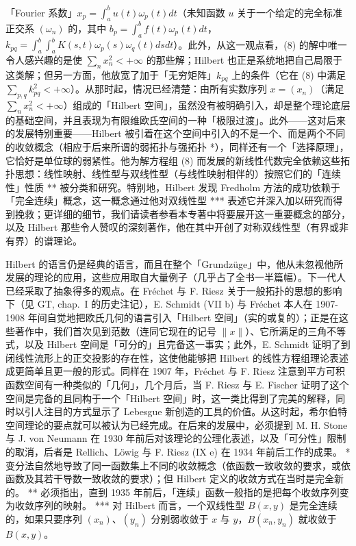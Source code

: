 「Fourier 系数」\(x_{p} = \int_{a}^{b} u(t) \omega_{p}(t) dt\)（未知函数 \(u\) 关于一个给定的完全标准正交系 \((\omega_{n})\) 的，其中 \(b_{p} = \int_{a}^{b} f(t) \omega_{p}(t) dt\)，\(k_{pq} = \int_{a}^{b} \int_{a}^{b} K(s, t) \omega_{p}(s) \omega_{q}(t) ds dt\)）。此外，从这一观点看，(8) 的解中唯一令人感兴趣的是使 \(\sum_{n} x_{n}^{2} < +\infty\) 的那些解；Hilbert 也正是系统地把自己局限于这类解；但另一方面，他放宽了加于「无穷矩阵」\(k_{pq}\) 上的条件（它在 (8) 中满足 \(\sum_{p,q} k_{pq}^{2} < +\infty\)）。从那时起，情况已经清楚：由所有实数序列 \(x = (x_{n})\)（满足 \(\sum_{n} x_{n}^{2} < +\infty\)）组成的「Hilbert 空间」，虽然没有被明确引入，却是整个理论底层的基础空间，并且表现为有限维欧氏空间的一种「极限过渡」。此外——这对后来的发展特别重要——Hilbert 被引着在这个空间中引入的不是一个、而是两个不同的收敛概念（相应于后来所谓的弱拓扑与强拓扑 *），同样还有一个「选择原理」，它恰好是单位球的弱紧性。他为解方程组 (8) 而发展的新线性代数完全依赖这些拓扑思想：线性映射、线性型与双线性型（与线性映射相伴的）按照它们的「连续性」性质 ** 被分类和研究。特别地，Hilbert 发现 Fredholm 方法的成功依赖于「完全连续」概念，这一概念通过他对双线性型 *** 表述它并深入加以研究而得到挽救；更详细的细节，我们请读者参看本专著中将要展开这一重要概念的部分，以及 Hilbert 那些令人赞叹的深刻著作，他在其中开创了对称双线性型（有界或非有界）的谱理论。

Hilbert 的语言仍是经典的语言，而且在整个「Grundzüge」中，他从未忽视他所发展的理论的应用，这些应用取自大量例子（几乎占了全书一半篇幅）。下一代人已经采取了抽象得多的观点。在 Fréchet 与 F. Riesz 关于一般拓扑的思想的影响下（见 GT, chap.~I 的历史注记），E. Schmidt (VII b) 与 Fréchet 本人在 1907-1908 年间自觉地把欧氏几何的语言引入「Hilbert 空间」（实的或复的）；正是在这些著作中，我们首次见到范数（连同它现在的记号 \(\| x \|\)）、它所满足的三角不等式，以及 Hilbert 空间是「可分的」且完备这一事实；此外，E. Schmidt 证明了到闭线性流形上的正交投影的存在性，这使他能够把 Hilbert 的线性方程组理论表述成更简单且更一般的形式。同样在 1907 年，Fréchet 与 F. Riesz 注意到平方可积函数空间有一种类似的「几何」，几个月后，当 F. Riesz 与 E. Fischer 证明了这个空间是完备的且同构于一个「Hilbert 空间」时，这一类比得到了完美的解释，同时以引人注目的方式显示了 Lebesgue 新创造的工具的价值。从这时起，希尔伯特空间理论的要点就可以被认为已经完成。在后来的发展中，必须提到 M. H. Stone 与 J. von Neumann 在 1930 年前后对该理论的公理化表述，以及「可分性」限制的取消，后者是 Rellich、Löwig 与 F. Riesz (IX e) 在 1934 年前后工作的成果。
* 变分法自然地导致了同一函数集上不同的收敛概念（依函数一致收敛的要求，或依函数及其若干导数一致收敛的要求）；但 Hilbert 定义的收敛方式在当时是完全新的。
** 必须指出，直到 1935 年前后，「连续」函数一般指的是把每个收敛序列变为收敛序列的映射。
*** 对 Hilbert 而言，一个双线性型 \(B(x, y)\) 是完全连续的，如果只要序列 \((x_{n})\)、\((y_{n})\) 分别弱收敛于 \(x\) 与 \(y\)，\(B(x_{n}, y_{n})\) 就收敛于 \(B(x, y)\)。

